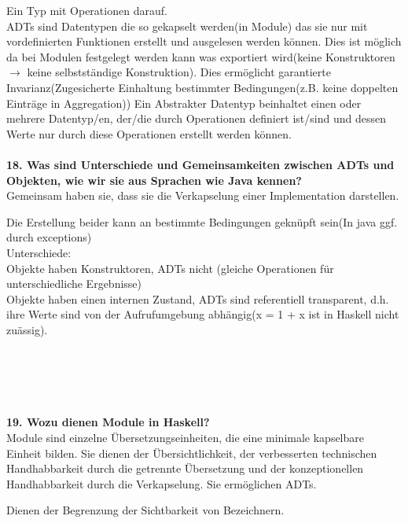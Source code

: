 \documentclass{article}
\begin{document}
Ein Typ mit Operationen darauf.\\
ADTs sind Datentypen die so gekapselt werden(in Module) das sie nur mit vordefinierten Funktionen erstellt und ausgelesen werden k\"onnen.
Dies ist m\"oglich da bei Modulen festgelegt werden kann was exportiert wird(keine Konstruktoren $\rightarrow$ keine selbstst\"andige Konstruktion). Dies erm\"oglicht garantierte Invarianz(Zugesicherte Einhaltung bestimmter Bedingungen(z.B. keine doppelten Eintr\"age in Aggregation))
Ein Abstrakter Datentyp beinhaltet einen oder mehrere Datentyp/en, der/die durch Operationen definiert ist/sind und dessen Werte nur durch diese Operationen erstellt werden können.
\\
\\
\textbf{18. Was sind Unterschiede und Gemeinsamkeiten zwischen ADTs und Objekten, wie wir sie aus Sprachen wie Java kennen?}
\\
Gemeinsam haben sie, dass sie die Verkapselung einer Implementation darstellen.

Die Erstellung beider kann an bestimmte Bedingungen gekn\"upft sein(In java ggf. durch exceptions)
\\
Unterschiede:\\
Objekte haben Konstruktoren, ADTs nicht (gleiche Operationen für unterschiedliche Ergebnisse)\\
Objekte haben einen internen Zustand, ADTs sind 
referentiell transparent, d.h. ihre Werte sind von der Aufrufumgebung abhängig(x = 1 + x ist in Haskell nicht zu\"assig).\\
\\
\\
\\
\\
\\
\textbf{19. Wozu dienen Module in Haskell?}
\\
Module sind einzelne Übersetzungseinheiten, die eine minimale kapselbare Einheit bilden. Sie dienen der Übersichtlichkeit, der verbesserten technischen Handhabbarkeit durch die getrennte Übersetzung und der konzeptionellen Handhabbarkeit durch die Verkapselung. Sie erm\"oglichen ADTs.

Dienen der Begrenzung der Sichtbarkeit von Bezeichnern.\\
\end{document}
